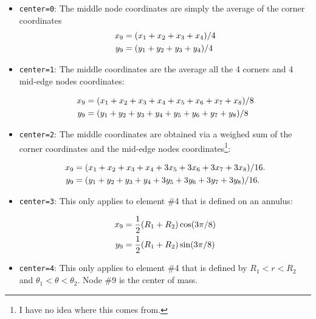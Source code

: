 \begin{itemize}
\item \lstinline{center=0}: The middle node coordinates are simply the 
average of the corner coordinates 
\begin{align}
x_9&=(x_1+x_2+x_3+x_4)/4 \nonumber\\
y_9&=(y_1+y_2+y_3+y_4)/4 \nonumber
\end{align}

\item \lstinline{center=1}: The middle coordinates are the average all the 
4 corners and 4 mid-edge nodes coordinates:

\begin{align}
x_9&=(x_1+x_2+x_3+x_4+x_5+x_6+x_7+x_8)/8 \nonumber\\
y_9&=(y_1+y_2+y_3+y_4+y_5+y_6+y_7+y_8)/8 \nonumber
\end{align}

\item \lstinline{center=2}: The middle coordinates are obtained via a 
weighed sum of the corner coordinates and the mid-edge nodes 
coordinates\footnote{I have no idea where this comes from.}: 

\begin{align}
x_9&=(x_1+x_2+x_3+x_4+3x_5+3x_6+3x_7+3x_8)/16. \nonumber\\
y_9&=(y_1+y_2+y_3+y_4+3y_5+3y_6+3y_7+3y_8)/16. \nonumber
\end{align}

\item \lstinline{center=3}: This only applies to element \#4 that is defined on an annulus:

\begin{align}
x_9&=\frac12(R_1+R_2)\cos(3\pi/8) \nonumber\\
y_9&=\frac12(R_1+R_2)\sin(3\pi/8) \nonumber
\end{align}


\item \lstinline{center=4}: This only applies to element \#4 that is 
defined by $R_1<r<R_2$ and $\theta_1<\theta<\theta_2$. Node \#9 is the center of mass. 



\end{itemize}
